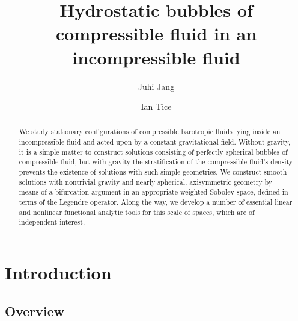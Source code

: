 \documentclass[11pt,reqno]{amsart}
\title[Hydrostatic bubbles]{Hydrostatic bubbles of compressible fluid in an incompressible fluid}
\author{Juhi Jang}
\author{Ian Tice}
\numberwithin{equation}{section}
\begin{document}
\begin{abstract} 
We study stationary configurations of compressible barotropic fluids lying inside an incompressible fluid and acted upon by a constant gravitational field.  Without gravity, it is a simple matter to construct solutions consisting of perfectly spherical bubbles of compressible fluid, but with gravity the stratification of the compressible fluid's density prevents the existence of solutions with such simple geometries.  We construct smooth solutions with nontrivial gravity and nearly spherical, axisymmetric geometry by means of a bifurcation argument in an appropriate weighted Sobolev space, defined in terms of the Legendre operator.  Along the way, we develop a number of essential linear and nonlinear functional analytic tools for this scale of spaces, which are of independent interest. 
\end{abstract}


\maketitle
 


\section{Introduction }
  
\subsection{Overview }
 
\end{document}
